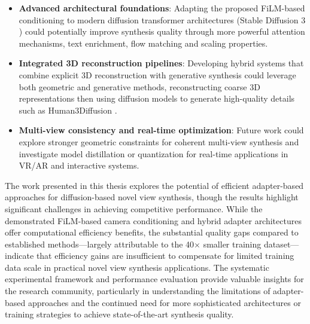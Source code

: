 \begin{itemize}
  \item \textbf{Advanced architectural foundations}: Adapting the proposed FiLM-based conditioning to modern diffusion transformer architectures (Stable Diffusion 3 \cite{stable_diffusion_3, diffusion_transformers}) could potentially improve synthesis quality through more powerful attention mechanisms, text enrichment, flow matching and scaling properties.

  \item \textbf{Integrated 3D reconstruction pipelines}: Developing hybrid systems that combine explicit 3D reconstruction with generative synthesis could leverage both geometric and generative methods, reconstructing coarse 3D representations then using diffusion models to generate high-quality details such as Human3Diffusion \cite{human3diffusion}.

  \item \textbf{Multi-view consistency and real-time optimization}: Future work could explore stronger geometric constraints for coherent multi-view synthesis and investigate model distillation or quantization for real-time applications in VR/AR and interactive systems.
\end{itemize}

The work presented in this thesis explores the potential of efficient adapter-based approaches for diffusion-based novel view synthesis, though the results highlight significant challenges in achieving competitive performance. While the demonstrated FiLM-based camera conditioning and hybrid adapter architectures offer computational efficiency benefits, the substantial quality gaps compared to established methods—largely attributable to the 40$\times$ smaller training dataset—indicate that efficiency gains are insufficient to compensate for limited training data scale in practical novel view synthesis applications. The systematic experimental framework and performance evaluation provide valuable insights for the research community, particularly in understanding the limitations of adapter-based approaches and the continued need for more sophisticated architectures or training strategies to achieve state-of-the-art synthesis quality.
